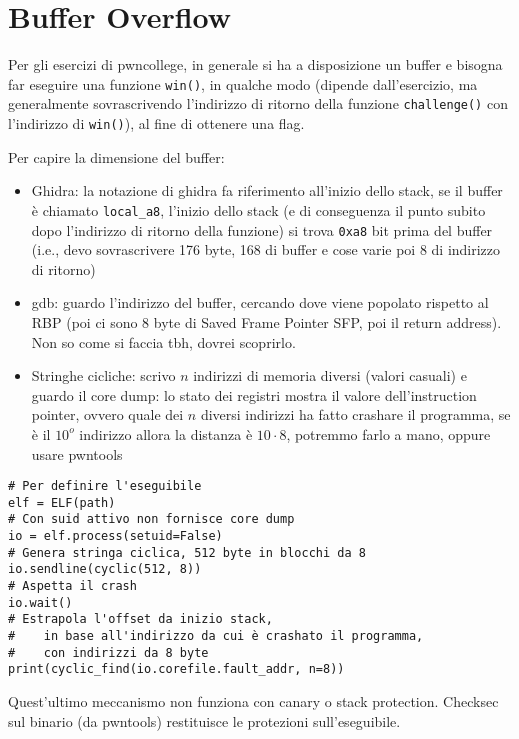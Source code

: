 
\section{Buffer Overflow}

Per gli esercizi di pwncollege, in generale si ha a disposizione un buffer e bisogna far eseguire una funzione \texttt{win()}, in qualche modo (dipende dall'esercizio, ma generalmente sovrascrivendo l'indirizzo di ritorno della funzione \texttt{challenge()} con l'indirizzo di \texttt{win()}), al fine di ottenere una flag.

Per capire la dimensione del buffer: 
\begin{itemize}
	\item Ghidra: la notazione di ghidra fa riferimento all'inizio dello stack, se il buffer è chiamato \texttt{local\_a8}, l'inizio dello stack (e di conseguenza il punto subito dopo l'indirizzo di ritorno della funzione) si trova \texttt{0xa8} bit prima del buffer (i.e., devo sovrascrivere 176 byte, 168 di buffer e cose varie poi 8 di indirizzo di ritorno)
    
	\item gdb: guardo l'indirizzo del buffer, cercando dove viene popolato rispetto al RBP (poi ci sono 8 byte di Saved Frame Pointer SFP, poi il return address). Non so come si faccia tbh, dovrei scoprirlo.
	
    \item Stringhe cicliche: scrivo $n$ indirizzi di memoria diversi (valori casuali) e guardo il core dump: lo stato dei registri mostra il valore dell'instruction pointer, ovvero quale dei $n$ diversi indirizzi ha fatto crashare il programma, se è il $10^o$ indirizzo allora la distanza è $10 \cdot 8$, potremmo farlo a mano, oppure usare pwntools
\end{itemize}

\begin{verbatim}
# Per definire l'eseguibile
elf = ELF(path) 
# Con suid attivo non fornisce core dump
io = elf.process(setuid=False)
# Genera stringa ciclica, 512 byte in blocchi da 8 
io.sendline(cyclic(512, 8)) 
# Aspetta il crash
io.wait() 
# Estrapola l'offset da inizio stack, 
#    in base all'indirizzo da cui è crashato il programma,
#    con indirizzi da 8 byte
print(cyclic_find(io.corefile.fault_addr, n=8))
\end{verbatim}

Quest'ultimo  meccanismo non funziona con canary o stack protection. Checksec sul binario (da pwntools) restituisce le protezioni sull'eseguibile. 

